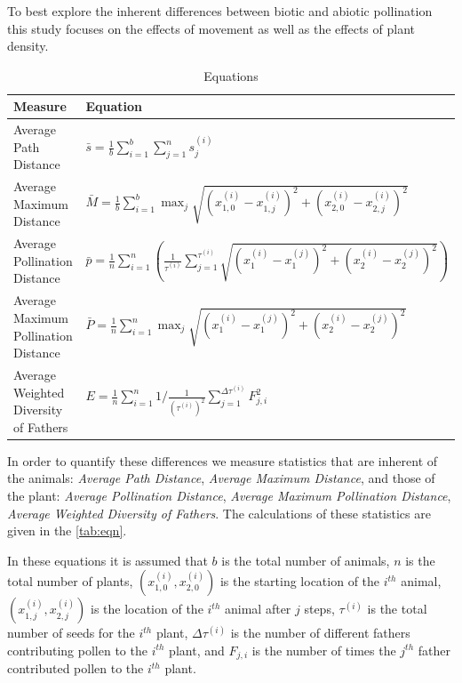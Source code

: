   To best explore the inherent differences between biotic and abiotic pollination this study focuses
  on the effects of movement as well as the effects of plant density.  
  \begin{table}[h]
  \setlength{\extrarowheight}{10pt}
    {\footnotesize
    \begin{tabular}{|l|l|}
      \hline
      Measure & Equation \\[8pt] \hline   \hline
      Average Path Distance & $\bar{s} = \frac{1}{b} \sum_{i=1}^b \sum_{j=1}^n s^{\left(i\right)}_j$ \\[8pt] \hline
      Average Maximum Distance & $ \bar{M} = \frac{1}{b} \sum_{i=1}^b \max_j \sqrt{\left(x^{\left(i\right)}_{1,0}
    - x^{\left(i\right)}_{1,j}\right)^2 +
          \left(x^{\left(i\right)}_{2,0} -
    x^{\left(i\right)}_{2,j}\right)^2}  $ \\[8pt] \hline
      Average Pollination Distance & $ \bar{p} = \frac{1}{n} \sum_{i=1}^{n} \left(
    \frac{1}{\tau^{\left(i\right)}} \sum_{j=1}^{\tau^{\left(i\right)}}
    \sqrt{\left(x^{\left(i\right)}_1 -
    x^{\left(j\right)}_1\right)^2 + \left(x^{\left(i\right)}_2 -
        x^{\left(j\right)}_2\right)^2}
        \right)  $ \\[12pt]  \hline
      Average Maximum Pollination Distance & $ \bar{P} = \frac{1}{n} \sum_{i=1}^{n} \max_j \sqrt{\left(x^{\left(i\right)}_1 -
    x^{\left(j\right)}_1\right)^2 + \left(x^{\left(i\right)}_2 -
        x^{\left(j\right)}_2\right)^2}$ \\[8pt]  \hline
      Average Weighted Diversity of Fathers & $ E = \frac{1}{n} \sum_{i=1}^n 1/\frac{1}{\left(\tau^{\left(i\right)}\right)^2}
      \sum_{j=1}^{\Delta\tau^{\left(i\right)}} F^2_{j,i} $ \\[8pt]
      \hline
    \end{tabular}
  }
    \caption{Equations}
    \label{tab:eqn}
  \end{table}
  In order to quantify these differences we measure statistics that are inherent of the animals:
  \emph{Average Path Distance}, \emph{Average Maximum Distance}, and those of the plant:
  \emph{Average Pollination Distance}, \emph{Average Maximum Pollination Distance}, \emph{Average
  Weighted Diversity of Fathers}.  The calculations of these statistics are given in the
  \autoref{tab:eqn}.

  In these equations it is assumed that $b$ is the total number of animals, $n$ is the total number
  of plants, $(x_{1,0}^{(i)},x_{2,0}^{(i)})$ is the starting location of the $i^{th}$ animal,
  $(x_{1,j}^{(i)},x_{2,j}^{(i)})$ is the location of the $i^{th}$ animal after $j$ steps,
  $\tau^{(i)}$ is the total number of seeds for the $i^{th}$ plant, $\Delta\tau^{(i)}$ is the number
  of different fathers contributing pollen to the $i^{th}$ plant, and $F_{j,i}$ is the number of
  times the $j^{th}$ father contributed pollen to the $i^{th}$ plant.

